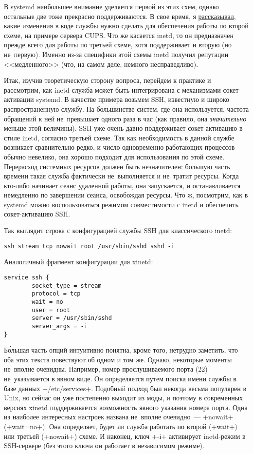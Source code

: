 \documentclass[10pt,oneside,a4paper]{article}
\begin{document}
В systemd наибольшее внимание уделяется первой из этих схем, однако остальные
две тоже прекрасно поддерживаются. В свое время, я
\href{http://0pointer.de/blog/projects/socket-activation2.html}{рассказывал},
какие изменения в коде службы нужно сделать для обеспечения работы по второй
схеме, на примере сервера CUPS. Что же касается inetd, то он предназначен прежде
всего для работы по третьей схеме, хотя поддерживает и вторую (но не~первую).
Именно из-за специфики этой схемы inetd получил репутации <<медленного>> (что,
на самом деле, немного несправедливо).

Итак, изучив теоретическую сторону вопроса, перейдем к практике и рассмотрим,
как inetd-служба может быть интегрирована с механизмами сокет-активации systemd.
В качестве примера возьмем SSH, известную и широко распространенную службу. На
большинстве систем, где она используется, частота обращений к ней не~превышает
одного раза в час (как правило, она \emph{значительно} меньше этой величины).
SSH уже очень давно поддерживает сокет-активацию в стиле inetd, согласно третьей
схеме. Так как необходимость в данной службе возникает сравнительно редко, и
число одновременно работающих процессов обычно невелико, она хорошо подходит для
использования по этой схеме. Перерасход системных ресурсов должен быть
незначителен: большую часть времени такая служба фактически не~выполняется и
не~тратит ресурсы. Когда кто-либо начинает сеанс удаленной работы, она
запускается, и останавливается немедленно по завершении сеанса, освобождая
ресурсы. Что ж, посмотрим, как в systemd можно воспользоваться режимом
совместимости с inetd и обеспечить сокет-активацию SSH.

Так выглядит строка с конфигурацией службы SSH для классического inetd:
\begin{Verbatim}
ssh stream tcp nowait root /usr/sbin/sshd sshd -i
\end{Verbatim}

Аналогичный фрагмент конфигурации для xinetd:
\begin{Verbatim}
service ssh {
        socket_type = stream
        protocol = tcp
        wait = no
        user = root
        server = /usr/sbin/sshd
        server_args = -i
}
\end{Verbatim}

Б\'{о}льшая часть опций интуитивно понятна, кроме того, нетрудно заметить, что оба
этих текста повествуют об одном и том же. Однако, некоторые моменты не~вполне
очевидны. Например, номер прослушиваемого порта (22) не~указывается в явном
виде. Он определяется путем поиска имени службы в базе данных +/etc/services+.
Подобный подход был некогда весьма популярен в Unix, но сейчас он уже постепенно
выходит из моды, и поэтому в современных версиях xinetd поддерживается возможность
явного указания номера порта. Одна из наиболее интересных настроек названа
не~вполне очевидно~--- +nowait+ (+wait=no+). Она определяет, будет ли служба
работать по второй (+wait+) или третьей (+nowait+) схеме. И наконец, ключ +-i+
активирует inetd-режим в SSH-сервере (без этого ключа он работает в независимом
режиме).
\end{document}
